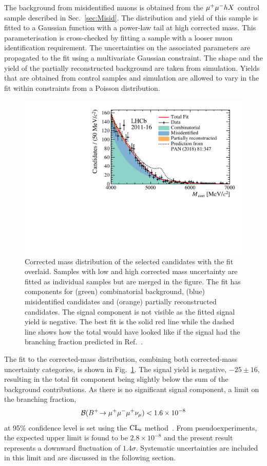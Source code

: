 The background from misidentified muons is obtained from the ${\mu^+\mu^-} h X$ control sample described in Sec.~\ref{sec:Misid}. The distribution and yield of this sample is fitted to a Gaussian function with a power-law tail at high corrected mass. This parameterisation is cross-checked by fitting a sample with a looser muon identification requirement. The uncertainties on the associated parameters are propagated to the fit using a multivariate Gaussian constraint. The shape and the yield of the partially reconstructed background are taken from simulation. Yields that are obtained from control samples and simulation are allowed to vary in the fit within constraints from a Poisson distribution.

\begin{figure}[t]
  \centering
  \includegraphics[width=0.85\linewidth]{Figure_4.pdf}
  \caption{\small Corrected mass distribution of the selected \Bmumumu
    candidates with the fit overlaid. Samples with low and high
    corrected mass uncertainty are fitted as individual samples but
    are merged in the figure. The fit has components for (green) combinatorial background, (blue) misidentified candidates and (orange) partially reconstructed candidates. The signal component is not visible as
    the fitted signal yield is negative. The best fit is the solid red line while the dashed line shows how the
    total would have looked like if the signal had the branching
    fraction predicted in Ref.~\cite{Danilina:2018uzr}.}
  \label{fig:signalfit}
\end{figure}
The fit to the corrected-mass distribution, combining both corrected-mass uncertainty categories, is shown in Fig.~\ref{fig:signalfit}. The signal yield is negative,  $-25\pm16$, resulting in the total fit component being slightly below the sum of the background contributions. As there is no significant signal component, a limit on the branching fraction, 
\begin{equation*}
    {\ensuremath{\mathcal{B}}}({{{B}^+}}\!\rightarrow {\ensuremath{\mu^+}}{\ensuremath{\mu^-}}{\ensuremath{\mu^+}}\nu_\mu) < 1.6\times 10^{-8}
\end{equation*}
at 95\% confidence level is set using the  $\rm{CL}_{\rm s}$ method~\cite{CLS}. 
From pseudoexperiments,
the expected upper limit is found to be $2.8\times 10^{-8}$ and the present result represents a downward
fluctuation of $1.4\sigma$. Systematic uncertainties are included in this limit and are discussed in the
following section.
